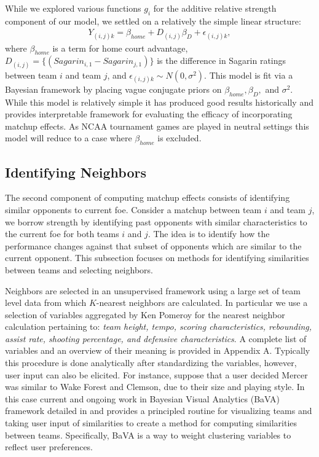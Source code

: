 \documentclass[letterpaper,12pt]{article}
\begin{document}
While we explored various functions $g_i$ for the additive relative strength component of our model, we settled on a relatively the simple linear structure:
\begin{eqnarray}
Y_{(i,j)k} =  \beta_{home} + D_{(i,j)}\beta_D +  \epsilon_{(i,j)k},
\label{eq:RS2}
\end{eqnarray}
where $\beta_{home}$ is a term for home court advantage, $D_{(i,j)}=\{(Sagarin_{i,1} - Sagarin_{j,1})\}$ is the difference in Sagarin ratings between team $i$ and team $j$, and $\epsilon_{(i,j)k} \sim N(0,\sigma^2).$ This model is fit via a Bayesian framework by placing vague conjugate priors on $\beta_{home}, \beta_D,$ and $ \sigma^2$. While this model is relatively simple it has produced good results historically \cite{carlin1996} and provides interpretable framework for evaluating the efficacy of incorporating matchup effects. As NCAA tournament games are played in neutral settings this model will reduce to a case where $\beta_{home}$ is excluded.

\subsection{Identifying Neighbors}
The second component of computing matchup effects consists of identifying similar opponents to current foe. Consider a matchup between team $i$ and team $j$, we borrow strength by identifying past opponents with similar characteristics to the current foe for both teams $i$ and $j$. The idea is to identify how the performance changes against that subset of opponents which are similar to the current opponent. This subsection focuses on methods for identifying similarities between teams and selecting neighbors.

Neighbors are selected in an unsupervised framework using a large set of team level data from which $K$-nearest neighbors are calculated. In particular we use a selection of variables aggregated by Ken Pomeroy \citep{kenpom.com} for the nearest neighbor calculation pertaining to: \emph{team height, tempo, scoring characteristics, rebounding,  assist rate, shooting percentage, and defensive characteristics}. A complete list of variables and an overview of their meaning is provided in Appendix A. Typically this procedure is done analytically after standardizing the variables, however, user input can also be elicited. For instance, suppose that a user decided Mercer was similar to Wake Forest and Clemson, due to their size and playing style. In this case current and ongoing work in Bayesian Visual Analytics (BaVA) framework detailed in \cite{house2010}  and \cite{hu2013} provides a principled routine for visualizing teams and taking user input of similarities to create a method for computing similarities between teams. Specifically, BaVA is a way to weight clustering variables to reflect user preferences.
\end{document}
